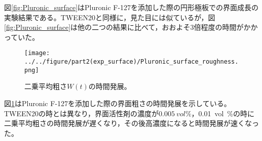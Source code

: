 \documentclass[autodetect-engine,dvi=dvipdfmx,a4paper,ja=standard,oneside,openany,11pt]{bxjsbook}
\begin{document}
図\ref{fig:Pluronic_surface}はPluronic F-127を添加した際の円形極板での界面成長の実験結果である。TWEEN20と同様に，見た目には似ているが，図\ref{fig:Pluronic_surface}は他の二つの結果に比べて，おおよそ3倍程度の時間がかかっていた。

\begin{figure}[htbp]
  \centering
  \texttt{[image: ../../figure/part2(exp\_surface)/Pluronic\_surface\_roughness.png]}
  \caption{二乗平均粗さ$W(t)$の時間発展。}
  \label{fig:surface_roughness_Pluronic}
\end{figure}

図\ref{fig:surface_roughness_Pluronic}はPluronic F-127を添加した際の界面粗さの時間発展を示している。TWEEN20の時とは異なり，界面活性剤の濃度が$\SI{0.005}{vol\%}，$\SI{0.01}{vol\%}の時に二乗平均粗さの時間発展が遅くなり，その後高濃度になると時間発展が速くなった。

\ifdraft{
  
  
}{}
\end{document}
